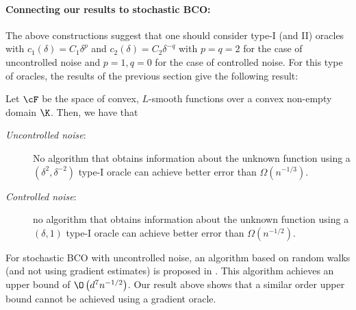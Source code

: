 \paragraph{Connecting our results to stochastic BCO:}
The above constructions suggest that one should consider type-I (and II) oracles with $c_1(\delta) = C_1 \delta^p$ and $c_2(\delta) = C_2\delta^{-q}$ with $p=q=2$ for the case of uncontrolled noise and $p=1, q=0$ for the case of controlled noise.
For this type of oracles, the results of the previous section give the following result: 
\begin{theorem}\label{thm:aaab}
Let $\cF$ be the space of convex, $L$-smooth functions over a convex non-empty domain $\K$.
Then, we have that
\begin{description}
\item[\textit{Uncontrolled noise}:]  No algorithm that obtains information about the unknown function using a 
$(\delta^2,\delta^{-2})$ type-I oracle
 can achieve better error than $\Omega(n^{-1/3})$.
\item[\textit{Controlled noise}:]  no algorithm that obtains information about the unknown function using a 
$(\delta,1)$ type-I oracle
 can achieve better error than $\Omega(n^{-1/2})$.
\end{description}
\end{theorem}

For stochastic BCO with uncontrolled noise, an algorithm based on random walks (and not using gradient estimates) is proposed in \cite{liang2014zeroth}. This algorithm achieves an upper bound of $\O\left(d^7 n^{-1/2}\right)$. Our result above shows that a similar order upper bound cannot be achieved using a gradient oracle. 


